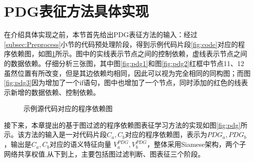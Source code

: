 \section{PDG表征方法具体实现}
\label{sec:PDGachieve}
在介绍具体实现之前，本节首先给出PDG表征方法的输入：经过\ref{subsec:Preprocess}小节的代码预处理阶段，得到示例代码片段\ref{fig:code}对应的程序依赖图，如图\ref{fig:pdgcode}所示。图中的实线表示节点之间的控制依赖，虚线表示节点之间的数据依赖。仔细分析三张图，其中图\ref{fig:pdg1}和图\ref{fig:pdg2}红框中节点11、12虽然位置有所改变，但是其边依赖均相同，因此可以视为完全相同的同构图；而图\ref{fig:pdg3}因为增加了一个if语句，图中也增加了一个节点，同时添加的红色的线表示新增的数据依赖、控制依赖。

\begin{figure}[htbp]
  \centering  %
  \caption{示例源代码对应的程序依赖图}    %
  \label{fig:pdgcode}    %
\end{figure}

接下来，本章提出的基于图过滤的程序依赖图表征学习方法的实现如图\ref{fig:pdg}所示。该方法的输入是一对代码片段$C_{a},C_{b}$对应的程序依赖图，表示为$PDG_{a},PDG_{b}$，输出是$C_{a},C_{b}$对应的语义特征向量 $V_{a}^{PDG},V_{b}^{PDG}$，整体采用Siamese架构，两个子网络共享权值,从下到上，主要包括图过滤判断、图表征三个阶段。

